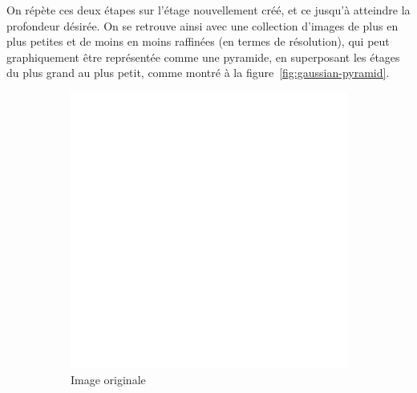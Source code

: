 On répète ces deux étapes sur l'étage nouvellement créé, et ce jusqu'à atteindre la profondeur désirée. On se retrouve ainsi avec une collection d'images de plus en plus petites et de moins en moins raffinées (en termes de résolution), qui peut graphiquement être représentée comme une pyramide, en superposant les étages du plus grand au plus petit, comme montré à la figure~\ref{fig:gaussian-pyramid}.

\begin{figure}[h]
    \centering

    \begin{subfigure}{.3\textwidth}
        \centering
        \includegraphics[width=\textwidth]{contenu/resources/images/gauss_0}
        \caption{Image originale}
    \end{subfigure}
    \hfill
    \begin{subfigure}{.3\textwidth}
        \centering

\end{subfigure}
\end{figure}
